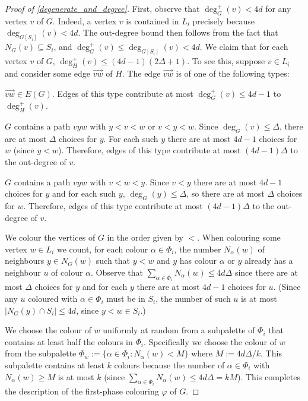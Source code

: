 \documentclass{patmorin}
\begin{document}
\begin{proof}[Proof of \cref{degenerate_and_degree}]
  First, observe that $\deg^+_G(v)< 4d$ for any vertex $v$ of $G$. Indeed, a vertex $v$ is contained in $L_i$ precisely because $\deg_{G[S_i]}(v)<4d$.  The out-degree bound then follows from the fact that $N_{G}(v)\subseteq S_i$, and $\deg^+_{G}(v)\le\deg_{G[S_i]}(v)<4d$.  We claim that for each vertex $v$ of $G$, $\deg^+_{H}(v)\le (4d-1)(2\Delta+1)$.  To see this, suppose $v\in L_i$ and consider some edge $\overrightarrow{vw}$ of $H$.  The edge  $\overrightarrow{vw}$ is of one of the following types:
  \begin{compactenum}[(T1)]
    \item $\overrightarrow{vw}\in E(G)$. Edges of this type contribute at most $\deg^+_{G}(v)\le 4d-1$ to $\deg^+_{H}(v)$.
    \item $G$ contains a path $vyw$ with $y < v < w$ or $v < y < w$.  Since $\deg_G(v)\le\Delta$, there are at most $\Delta$ choices for $y$.  For each such $y$ there are at most $4d-1$ choices for $w$ (since $y<w$).  Therefore, edges of this type contribute at most $(4d-1)\Delta$ to the out-degree of $v$.
    \item $G$ contains a path $vyw$ with $v < w < y$.  Since $v<y$ there are at most $4d-1$ choices for $y$ and for each such $y$, $\deg_G(y)\le\Delta$, so there are at most $\Delta$ choices for $w$.  Therefore, edges of this type contribute at most $(4d-1)\Delta$ to the out-degree of $v$.
  \end{compactenum}
  We colour the vertices of $G$ in the order given by $<$.  When colouring some vertex $w\in L_i$ we count, for each colour $\alpha\in \Phi_i$, the number $N_\alpha(w)$ of neighbours $y\in N_G(w)$ such that $y < w$ and $y$ has colour $\alpha$ or $y$ already has a neighbour $u$ of colour $\alpha$. Observe that $\sum_{\alpha\in \Phi_i} N_\alpha(w)\le 4d\Delta$ since there are at most $\Delta$ choices for $y$ and for each $y$ there are at most $4d-1$ choices for $u$.  (Since any $u$ coloured with $\alpha\in\Phi_i$ must be in $S_i$, the number of such $u$ is at most $|N_G(y)\cap S_i|\le 4d$, since $y < w\in S_i$.)

  We choose the colour of $w$ uniformly at random from a subpalette of $\Phi_i$ that contains at least half the colours in $\Phi_i$.  Specifically we choose the colour of $w$ from the subpalette $\Phi_w:=\{\alpha\in\Phi_i: N_{\alpha}(w)<M\}$ where $M:=4d\Delta/k$.  This subpalette contains at least $k$ colours because the number of $\alpha\in\Phi_i$ with $N_\alpha(w)\ge M$ is at most $k$ (since $\sum_{\alpha\in\Phi_i} N_\alpha(w) \le 4d\Delta = kM$).
  This completes the description of the first-phase colouring $\varphi$ of $G$.


\end{proof}
\end{document}
